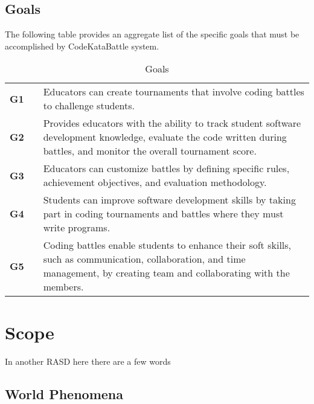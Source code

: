 \subsection{Goals}
The following table provides an aggregate list of the specific goals that must be accomplished by CodeKataBattle system.

\begin{table}[H]
    \centering
    \renewcommand{\arraystretch}{1.5} 
    \begin{tabular}{l l p{12.5cm}}
    \hline
        \textbf{G1} & & Educators can create tournaments that involve coding battles to challenge students. \\                                                                                                
        \textbf{G2} & & Provides educators with the ability to track student software development knowledge, evaluate the code written during battles, and monitor the overall tournament score. \\ 
        \textbf{G3} & & Educators can customize battles by defining specific rules, achievement objectives, and evaluation methodology. \\
        \textbf{G4} & & Students can improve software development skills by taking part in coding tournaments and battles where they must write programs. \\
        \textbf{G5} & & Coding battles enable students to enhance their soft skills, such as communication, collaboration, and time management, by creating team and collaborating with the members. \\
    \hline
    \end{tabular}
    \caption{Goals}
\end{table}

\section{Scope}

{\color{red} In another RASD here there are a few words}

\subsection{World Phenomena}

